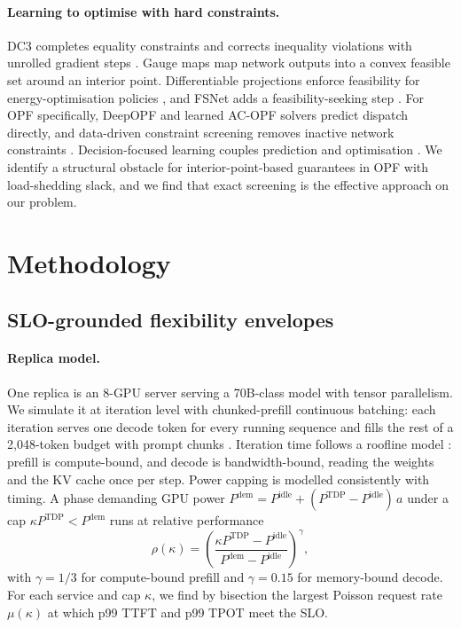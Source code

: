 \documentclass{article} %
\begin{document}
\paragraph{Learning to optimise with hard constraints.} DC3 completes equality constraints and corrects inequality violations with unrolled gradient steps \citep{donti2021dc3}. Gauge maps \citep{tabas2022safe,li2023loop} map network outputs into a convex feasible set around an interior point. Differentiable projections enforce feasibility for energy-optimisation policies \citep{chen2021enforcing}, and FSNet adds a feasibility-seeking step \citep{nguyen2025fsnet}. For OPF specifically, DeepOPF \citep{pan2021deepopf} and learned AC-OPF solvers \citep{zamzam2020learning} predict dispatch directly, and data-driven constraint screening removes inactive network constraints \citep{pineda2020screening}. Decision-focused learning couples prediction and optimisation \citep{donti2017taskbased}. We identify a structural obstacle for interior-point-based guarantees in OPF with load-shedding slack, and we find that exact screening is the effective approach on our problem.

\section{Methodology}
\label{sec:method}
\subsection{SLO-grounded flexibility envelopes}
\label{sec:envelope}
\paragraph{Replica model.} One replica is an 8-GPU server serving a 70B-class model with tensor parallelism. We simulate it at iteration level with chunked-prefill continuous batching: each iteration serves one decode token for every running sequence and fills the rest of a 2,048-token budget with prompt chunks \citep{agrawal2024sarathi,kwon2023pagedattention}. Iteration time follows a roofline model \citep{williams2009roofline}: prefill is compute-bound, and decode is bandwidth-bound, reading the weights and the KV cache once per step. Power capping is modelled consistently with timing. A phase demanding GPU power $P^{\mathrm{dem}} = P^{\mathrm{idle}} + (P^{\mathrm{TDP}} - P^{\mathrm{idle}})\,a$ under a cap $\kappa P^{\mathrm{TDP}} < P^{\mathrm{dem}}$ runs at relative performance
\begin{equation}
    \rho(\kappa) = \left(\frac{\kappa P^{\mathrm{TDP}} - P^{\mathrm{idle}}}{P^{\mathrm{dem}} - P^{\mathrm{idle}}}\right)^{\gamma},
    \label{eq:cap}
\end{equation}
with $\gamma = 1/3$ for compute-bound prefill and $\gamma = 0.15$ for memory-bound decode. For each service and cap $\kappa$, we find by bisection the largest Poisson request rate $\mu(\kappa)$ at which p99 TTFT and p99 TPOT meet the SLO.
\end{document}
